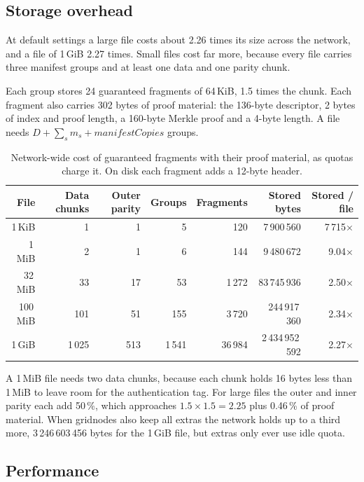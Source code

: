 \documentclass[10pt,a4paper,final]{article}
\begin{document}
\subsection{Storage overhead}
\label{sec:overhead}

At default settings a large file costs about 2.26 times its size across the network, and a file of 1\,GiB 2.27
times. Small files cost far more, because every file carries three manifest groups and at least one data and one
parity chunk.

Each group stores 24 guaranteed fragments of 64\,KiB, 1.5 times the chunk. Each fragment also carries 302 bytes of
proof material: the 136-byte descriptor, 2 bytes of index and proof length, a 160-byte Merkle proof and a 4-byte
length. A file needs $D + \sum_s m_s + \mathit{manifestCopies}$ groups.

\begin{table}[H]
\centering
\small
\begin{tabular}{@{}rrrrrrr@{}}
\toprule
File & Data chunks & Outer parity & Groups & Fragments & Stored bytes & Stored / file \\
\midrule
1\,KiB & 1 & 1 & 5 & 120 & 7\,900\,560 & 7\,715$\times$ \\
1\,MiB & 2 & 1 & 6 & 144 & 9\,480\,672 & 9.04$\times$ \\
32\,MiB & 33 & 17 & 53 & 1\,272 & 83\,745\,936 & 2.50$\times$ \\
100\,MiB & 101 & 51 & 155 & 3\,720 & 244\,917\,360 & 2.34$\times$ \\
1\,GiB & 1\,025 & 513 & 1\,541 & 36\,984 & 2\,434\,952\,592 & 2.27$\times$ \\
\bottomrule
\end{tabular}
\caption{Network-wide cost of guaranteed fragments with their proof material, as quotas charge it. On disk each
fragment adds a 12-byte header.}
\end{table}

A 1\,MiB file needs two data chunks, because each chunk holds 16 bytes less than 1\,MiB to leave room for the
authentication tag. For large files the outer and inner parity each add 50\,\%, which approaches $1.5 \times 1.5 =
2.25$ plus 0.46\,\% of proof material. When gridnodes also keep all extras the network holds up to a third more,
3\,246\,603\,456 bytes for the 1\,GiB file, but extras only ever use idle quota.

\subsection{Performance}
\label{sec:performance}
\end{document}
